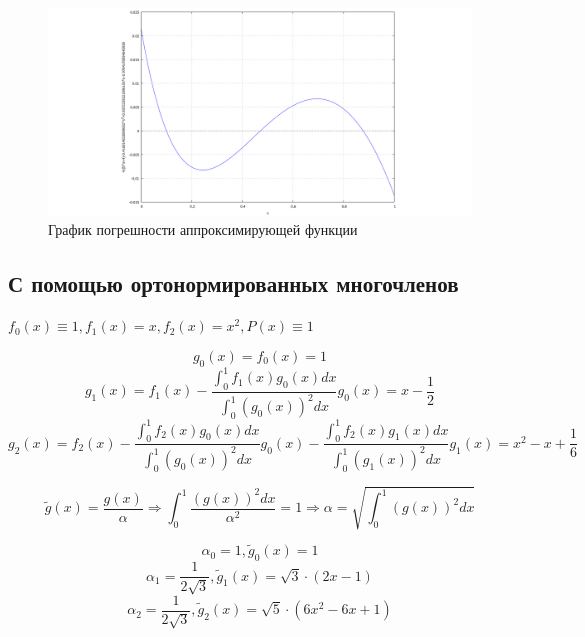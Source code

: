 \begin{figure}[H]
	\begin{center}
		\includegraphics[width=19cm]{e_polynoms.png}
		\caption{График погрешности аппроксимирующей функции} 
		\label{pic:2:1:2}
	\end{center}
\end{figure}

\newpage

\subsection{С помощью ортонормированных многочленов}

$f_0(x) \equiv 1, f_1(x) = x, f_2(x) = x^2, P(x) \equiv 1$

\begin{displaymath}
g_0(x) = f_0(x) = 1
\end{displaymath}
\begin{displaymath}
g_1(x) = f_1(x) - \frac{\int_0^1 f_1(x) g_0(x)dx}{\int_0^1 (g_0(x))^2dx}g_0(x) = x - \frac{1}{2}
\end{displaymath}
\begin{displaymath}
g_2(x) = f_2(x) - \frac{\int_0^1 f_2(x) g_0(x)dx}{\int_0^1 (g_0(x))^2dx}g_0(x) - \frac{\int_0^1 f_2(x) g_1(x)dx}{\int_0^1 (g_1(x))^2dx}g_1(x) = x^2 - x + \frac{1}{6}
\end{displaymath}

\begin{displaymath}
\tilde{g}(x) = \frac{g(x)}{\alpha} \Rightarrow \int_0^1 \frac{(g(x))^2dx}{\alpha^2} = 1 \Rightarrow \alpha = \sqrt{\int_0^1 (g(x))^2dx}
\end{displaymath}

\begin{displaymath}
\alpha_0 = 1, \tilde{g}_0(x) = 1
\end{displaymath}
\begin{displaymath}
\alpha_1 = \frac{1}{2 \sqrt{3}}, \tilde{g}_1(x) = \sqrt{3} \cdot (2x - 1)
\end{displaymath}
\begin{displaymath}
\alpha_2 = \frac{1}{2 \sqrt{3}}, \tilde{g}_2(x) = \sqrt{5} \cdot (6x^2 - 6x + 1)
\end{displaymath}

